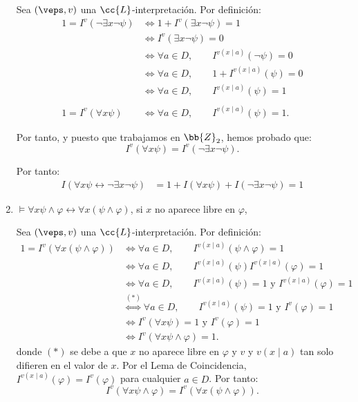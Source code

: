 \begin{ejercicio}
\begin{enumerate}
        Sea $(\veps,v)$ una $\cc{L}$-interpretación. Por definición:
        \begin{align*}
            1 = I^v(\neg \exists x \neg \psi)
            &\iff 1+I^v(\exists x \neg \psi) = 1\\
            &\iff I^{v}( \exists x \neg \psi) = 0\\
            &\iff \forall a\in D,\qquad I^{v(x\mid a)}(\neg \psi) = 0\\
            &\iff \forall a\in D,\qquad 1+I^{v(x\mid a)}(\psi) = 0\\
            &\iff \forall a\in D,\qquad I^{v(x\mid a)}(\psi) = 1\\\\
            1 = I^v(\forall x \psi)
            &\iff \forall a\in D,\qquad I^{v(x\mid a)}(\psi) = 1.
        \end{align*}

        Por tanto, y puesto que trabajamos en $\bb{Z}_2$, hemos probado que:
        \begin{equation*}
            I^v(\forall x \psi) =I^v(\neg \exists x \neg \psi).
        \end{equation*}

        Por tanto:
        \begin{align*}
            I( \forall x \psi \leftrightarrow \neg \exists x \neg \psi)
            &= 1+I(\forall x \psi)+I(\neg \exists x \neg \psi)=1
        \end{align*}
        \item $\models \forall x \psi \wedge \varphi \leftrightarrow \forall x(\psi \wedge \varphi)$, si $x$ no aparece libre en $\varphi$,
        
        Sea $(\veps,v)$ una $\cc{L}$-interpretación. Por definición:
        \begin{align*}
            1 = I^v(\forall x(\psi \wedge \varphi))
            &\iff \forall a\in D,\qquad I^{v(x\mid a)}(\psi \wedge \varphi) = 1\\
            &\iff \forall a\in D,\qquad I^{v(x\mid a)}(\psi)I^{v(x\mid a)}(\varphi) = 1\\
            &\iff \forall a\in D,\qquad I^{v(x\mid a)}(\psi) = 1\text{ y }I^{v(x\mid a)}(\varphi) = 1\\
            &\stackrel{(\ast)}{\iff} \forall a\in D,\qquad I^{v(x\mid a)}(\psi) = 1\text{ y }I^{v}(\varphi) = 1\\
            &\iff I^v(\forall x\psi)=1\text{ y }I^v(\varphi)=1\\
            &\iff I^v(\forall x\psi\wedge\varphi)=1.
        \end{align*}
        donde $(\ast)$ se debe a que $x$ no aparece libre en $\varphi$ y $v$ y $v(x\mid a)$ tan solo difieren en el valor de $x$.
        Por el Lema de Coincidencia, $I^{v(x\mid a)}(\varphi) = I^v(\varphi)$ para cualquier $a\in D$.
        Por tanto:
        \begin{equation*}
            I^v(\forall x \psi \wedge \varphi) = I^v(\forall x(\psi \wedge \varphi)).
        \end{equation*}


\end{enumerate}
\end{ejercicio}
